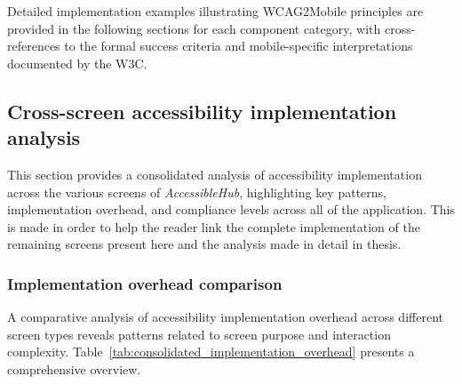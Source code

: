 Detailed implementation examples illustrating WCAG2Mobile principles are provided in the following sections for each component category, with cross-references to the formal success criteria and mobile-specific interpretations documented by the W3C.

\subsection{Cross-screen accessibility implementation analysis}
\label{subsec:cross-screen-analysis}

This section provides a consolidated analysis of accessibility implementation across the various screens of \textit{AccessibleHub}, highlighting key patterns, implementation overhead, and compliance levels across all of the application. This is made in order to help the reader link the complete implementation of the remaining screens present here and the analysis made in detail in thesis.

\subsubsection{Implementation overhead comparison}

A comparative analysis of accessibility implementation overhead across different screen types reveals patterns related to screen purpose and interaction complexity. Table~\ref{tab:consolidated_implementation_overhead} presents a comprehensive overview.


